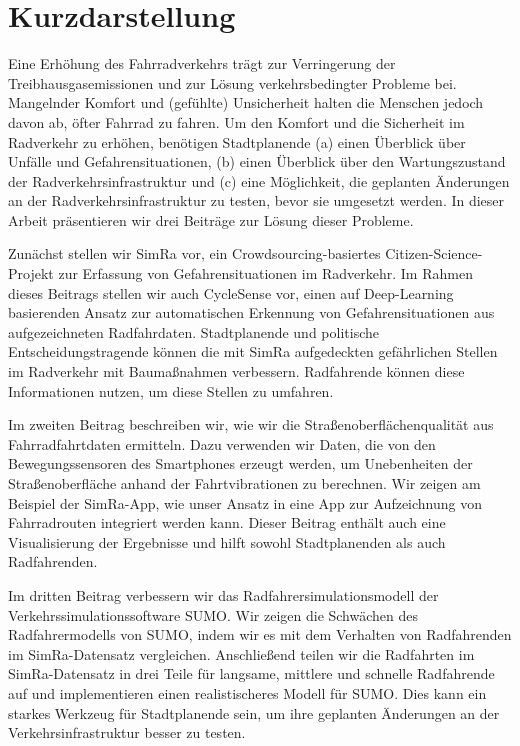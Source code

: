 \afterpage{\null\thispagestyle{empty}\newpage}
\section*{Kurzdarstellung}
Eine Erhöhung des Fahrradverkehrs trägt zur Verringerung der Treibhausgasemissionen und zur Lösung verkehrsbedingter Probleme bei.
Mangelnder Komfort und (gefühlte) Unsicherheit halten die Menschen jedoch davon ab, öfter Fahrrad zu fahren.
Um den Komfort und die Sicherheit im Radverkehr zu erhöhen, benötigen Stadtplanende (a) einen Überblick über Unfälle und Gefahrensituationen, (b) einen Überblick über den Wartungszustand der Radverkehrsinfrastruktur und (c) eine Möglichkeit, die geplanten Änderungen an der Radverkehrsinfrastruktur zu testen, bevor sie umgesetzt werden.
In dieser Arbeit präsentieren wir drei Beiträge zur Lösung dieser Probleme.

Zunächst stellen wir SimRa vor, ein Crowdsourcing-basiertes Citizen-Science-Projekt zur Erfassung von Gefahrensituationen im Radverkehr.
Im Rahmen dieses Beitrags stellen wir auch CycleSense vor, einen auf Deep-Learning basierenden Ansatz zur automatischen Erkennung von Gefahrensituationen aus aufgezeichneten Radfahrdaten.
Stadtplanende und politische Entscheidungstragende können die mit SimRa aufgedeckten gefährlichen Stellen im Radverkehr mit Baumaßnahmen verbessern.
Radfahrende können diese Informationen nutzen, um diese Stellen zu umfahren.

Im zweiten Beitrag beschreiben wir, wie wir die Straßenoberflächenqualität aus Fahrradfahrtdaten ermitteln.
Dazu verwenden wir Daten, die von den Bewegungssensoren des Smartphones erzeugt werden, um Unebenheiten der Straßenoberfläche anhand der Fahrtvibrationen zu berechnen.
Wir zeigen am Beispiel der SimRa-App, wie unser Ansatz in eine App zur Aufzeichnung von Fahrradrouten integriert werden kann.
Dieser Beitrag enthält auch eine Visualisierung der Ergebnisse und hilft sowohl Stadtplanenden als auch Radfahrenden.

Im dritten Beitrag verbessern wir das Radfahrersimulationsmodell der Verkehrssimulationssoftware SUMO.
Wir zeigen die Schwächen des Radfahrermodells von SUMO, indem wir es mit dem Verhalten von Radfahrenden im SimRa-Datensatz vergleichen.
Anschließend teilen wir die Radfahrten im SimRa-Datensatz in drei Teile für langsame, mittlere und schnelle Radfahrende auf und implementieren einen realistischeres Modell für SUMO.
Dies kann ein starkes Werkzeug für Stadtplanende sein, um ihre geplanten Änderungen an der Verkehrsinfrastruktur besser zu testen.
\afterpage{\null\thispagestyle{empty}\newpage}
